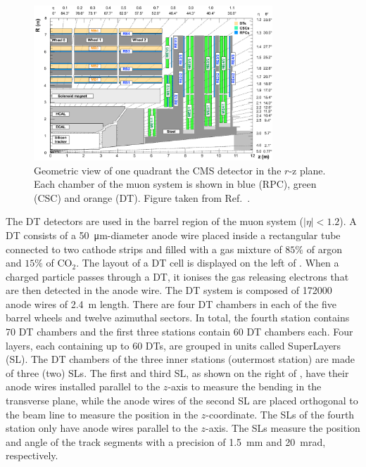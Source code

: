 \begin{figure}[!htbp]
 \centering
 \includegraphics[width=0.8\textwidth]{Figures/Experiment/CMS/MuonSystem.png}
 \caption{Geometric view of one quadrant the CMS detector in the $r$-z plane. Each chamber of the muon system is shown in blue (RPC), green (CSC) and orange (DT). Figure taken from Ref.~\cite{CMSMuonFig}.}
 \label{fig:CMS_Muon}
\end{figure}

The DT detectors are used in the barrel region of the muon system ($|\eta| < 1.2$). A DT consists of a \SI{50}{\um}-diameter anode wire placed inside a rectangular tube connected to two cathode strips and filled with a gas mixture of $85\%$ of argon and $15\%$ of $\text{CO}_{2}$. The layout of a DT cell is displayed on the left of . When a charged particle passes through a DT, it ionises the gas releasing electrons that are then detected in the anode wire. The DT system is composed of 172000 anode wires of \SI{2.4}{\m} length. There are four DT chambers in each of the five barrel wheels and twelve azimuthal sectors. In total, the fourth station contains 70 DT chambers and the first three stations contain 60 DT chambers each. Four layers, each containing up to 60 DTs, are grouped in units called SuperLayers (SL). The DT chambers of the three inner stations (outermost station) are made of three (two) SLs. The first and third SL, as shown on the right of , have their anode wires installed parallel to the $z$-axis to measure the bending in the transverse plane, while the anode wires of the second SL are placed orthogonal to the beam line to measure the position in the $z$-coordinate. The SLs of the fourth station only have anode wires parallel to the $z$-axis. The SLs measure the position and angle of the track segments with a precision of \SI{1.5}{\mm} and \SI{20}{\milli\radian}, respectively.

